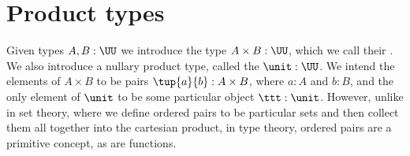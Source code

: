 %
%


\section{Product types}
\label{sec:finite-product-types}

Given types $A,B:\UU$ we introduce the type $A\times B:\UU$, which we call their .
%
%
%
%
We also introduce a nullary product type, called the  $\unit : \UU$.
%
%
%
We intend the elements of $A\times B$ to be pairs $\tup{a}{b} : A \times B$, where $a:A$ and $b:B$, and the only element of $\unit$ to be some particular object $\ttt : \unit$.
%
However, unlike in set theory, where we define ordered pairs to be particular sets and then collect them all together into the cartesian product, in type theory, ordered pairs are a primitive concept, as are functions.   

